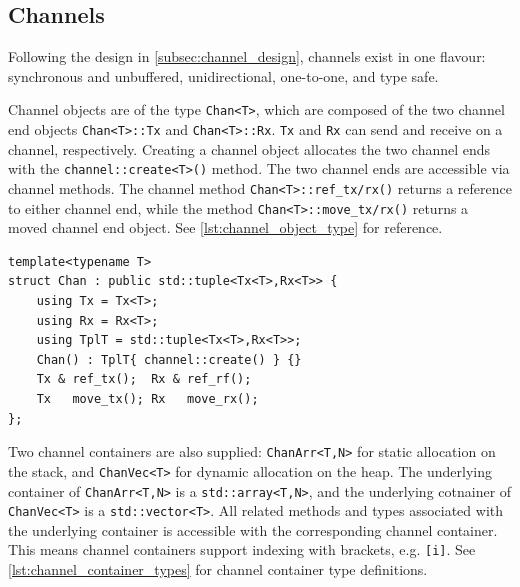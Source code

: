 \subsection{Channels}


Following the design in \cref{subsec:channel_design}, channels exist in one flavour: synchronous and unbuffered, unidirectional, one\hyp{}to\hyp{}one, and type safe. 

Channel objects are of the type \lstinline[style={CustomC++}]|Chan<T>|, which are composed of the two channel end objects \lstinline[style={CustomC++}]|Chan<T>::Tx| and \lstinline[style={CustomC++}]|Chan<T>::Rx|. \lstinline[style={CustomC++}]|Tx| and \lstinline[style={CustomC++}]|Rx| can send and receive on a channel, respectively. Creating a channel object allocates the two channel ends with the \lstinline[style={CustomC++}]|channel::create<T>()| method. The two channel ends are accessible via channel methods. The channel method \lstinline[style={CustomC++}]|Chan<T>::ref_tx/rx()| returns a reference to either channel end, while the method \lstinline[style={CustomC++}]|Chan<T>::move_tx/rx()| returns a moved channel end object. See \cref{lst:channel_object_type} for reference.

\begin{lstfloat}
\begin{lstlisting}[caption={Channel object type.}, label={lst:channel_object_type}, style={CustomC++}, xleftmargin={2em}]
template<typename T>
struct Chan : public std::tuple<Tx<T>,Rx<T>> {
    using Tx = Tx<T>;
    using Rx = Rx<T>;
    using TplT = std::tuple<Tx<T>,Rx<T>>;
    Chan() : TplT{ channel::create() } {}
    Tx & ref_tx();  Rx & ref_rf();
    Tx   move_tx(); Rx   move_rx();
};
\end{lstlisting}
\end{lstfloat}

Two channel containers are also supplied: \lstinline[style={CustomC++}]|ChanArr<T,N>| for static allocation on the stack, and \lstinline[style={CustomC++}]|ChanVec<T>| for dynamic allocation on the heap. The underlying container of \lstinline[style={CustomC++}]|ChanArr<T,N>| is a \lstinline[style={CustomC++}]|std::array<T,N>|, and the underlying cotnainer of \lstinline[style={CustomC++}]|ChanVec<T>| is a \lstinline[style={CustomC++}]|std::vector<T>|. All related methods and types associated with the underlying container is accessible with the corresponding channel container. This means channel containers support indexing with brackets, e.g. \lstinline[style={CustomC++}]|[i]|. See \cref{lst:channel_container_types} for channel container type definitions.

